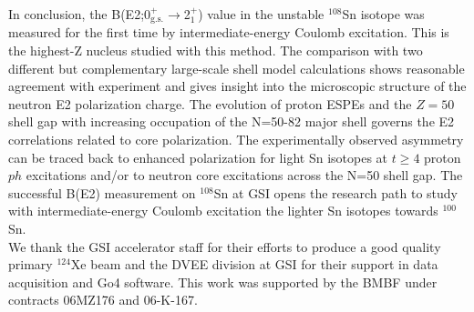 \documentclass[prc,twocolumn,amssymb,amsmath,showpacs,superscriptaddress]{revtex4}
\begin{document}
In conclusion, the B(E2;0$^+_{\text{g.s.}}$$\to$2$^{+}_1$) value
in the unstable $^{108}$Sn isotope was measured for the first time
by intermediate-energy Coulomb excitation. This is the highest-Z
nucleus studied with this method. The comparison with two
different but complementary large-scale shell model calculations
shows reasonable agreement with experiment and gives insight into
the microscopic structure of the neutron E2 polarization charge.
The evolution of proton ESPEs and the $Z=50$ shell gap with
increasing occupation of the N=50-82 major shell governs the E2
correlations related to core polarization. The experimentally
observed asymmetry can be traced back to enhanced polarization for
light Sn isotopes at $t \geq 4$ proton $ph$ excitations and/or to
neutron core excitations across the N=50 shell gap. The successful
B(E2) measurement on $^{108}$Sn at GSI opens the research path to
study with intermediate-energy
Coulomb excitation the lighter Sn isotopes towards $^{100}$Sn.\\

We thank the GSI accelerator staff for their efforts to produce a
good quality primary $^{124}$Xe beam and the DVEE division at GSI
for their support in data acquisition and Go4 software. This work
was supported by the BMBF under contracts 06MZ176 and 06-K-167.
\end{document}
